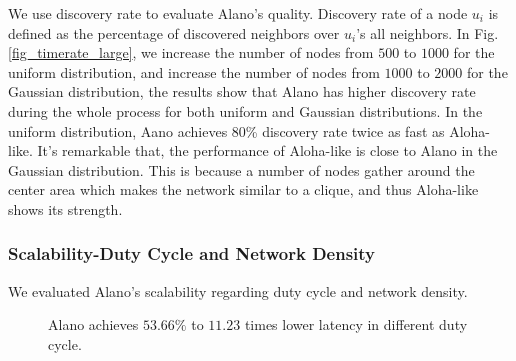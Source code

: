 We use discovery rate to evaluate Alano's quality.
Discovery rate of a node $u_i$ is defined as the percentage of discovered neighbors over $u_i$'s all neighbors.
In Fig. \ref{fig_timerate_large}, we increase the number of nodes from $500$ to $1000$ for the uniform distribution, and increase the number of nodes from $1000$ to $2000$ for the Gaussian distribution, the results show that Alano has higher discovery rate during the whole process for both uniform and Gaussian distributions. In the uniform distribution, Aano achieves 80\% discovery rate twice as fast as Aloha-like. It's remarkable that, the performance of Aloha-like is close to Alano in the Gaussian distribution. This is because a number of nodes gather around the center area which makes the network similar to a clique, and thus Aloha-like shows its strength.  





\subsubsection{Scalability-Duty Cycle and Network Density}

We evaluated Alano's scalability regarding duty cycle and network density.

\begin{figure}[!h]
\centering
{}
\hspace{0.01in}
\caption{Alano achieves $53.66\%$ to $11.23$ times lower latency in different duty cycle.}
\label{fig_dutycycle}
\end{figure}


